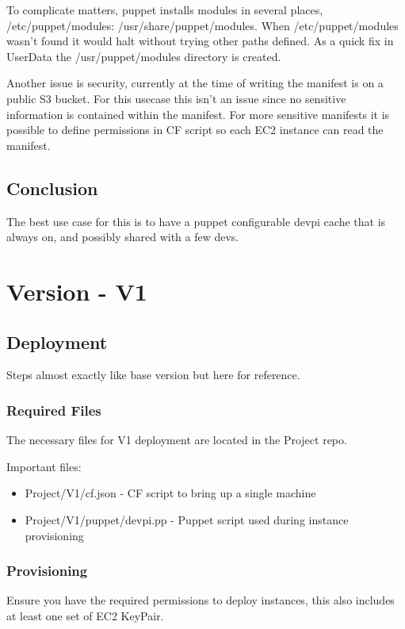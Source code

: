 \documentclass[12pt, letterpaper]{article}
\begin{document}
To complicate matters, puppet installs modules in several places, /etc/puppet/modules: /usr/share/puppet/modules. When 
/etc/puppet/modules wasn't found it would halt without trying other paths defined. As a quick fix in UserData the /usr/puppet/modules
directory is created.

Another issue is security, currently at the time of writing the manifest is on a public S3 bucket. For this usecase this isn't
an issue since no sensitive information is contained within the manifest. For more sensitive manifests it is possible to define 
permissions in CF script so each EC2 instance can read the manifest.

\subsection{Conclusion}
The best use case for this is to have a puppet configurable devpi cache that is always on, and possibly shared with a few devs. 

\section{Version - V1}

\subsection{Deployment}
Steps almost exactly like base version but here for reference.

\subsubsection{Required Files}
The necessary files for V1 deployment are located in the Project repo.

Important files:
\begin{itemize}
    \item Project/V1/cf.json - CF script to bring up a single machine
    \item Project/V1/puppet/devpi.pp - Puppet script used during instance provisioning
\end{itemize}

\subsubsection{Provisioning}
Ensure you have the required permissions to deploy instances, this also includes at least one set of EC2 KeyPair.
\end{document}
